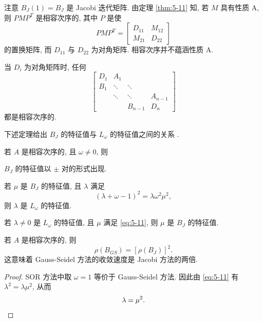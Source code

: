 注意 $B_J(1)=B_J$ 是 Jacobi 迭代矩阵. 由定理 \ref{thm:5-11} 知, 若 $M$ 具有性质 A, 则 $PMP^T$ 是相容次序的, 其中 $P$ 是使
\[
  PMP^T=
  \begin{bmatrix}
    D_{11} & M_{12}\\
    M_{21} & D_{22}
  \end{bmatrix}
\]
的置换矩阵, 而 $D_{11}$ 与 $D_{22}$ 为对角矩阵. 相容次序并不蕴涵性质 A.

\begin{example}
\label{ex:5-1}
当 $D_i$ 为对角矩阵时, 任何
\[
  \begin{bmatrix}
    D_1 & A_1 & & \\
    B_1 & \ddots & \ddots & \\
      & \ddots & \ddots & A_{n-1}\\
      & & B_{n-1} & D_n
  \end{bmatrix}
\]
都是相容次序的.
\end{example}

下述定理给出 $B_J$ 的特征值与 $L_\omega$ 的特征值之间的关系 \cite{src:30,src:85}.

\begin{theorem}
\label{thm:5-12}
若 $A$ 是相容次序的, 且 $\omega\neq0$, 则
\begin{romanlist}
  \item $B_J$ 的特征值以 $\pm$ 对的形式出现.
  \item 若 $\mu$ 是 $B_J$ 的特征值, 且 $\lambda$ 满足
  \begin{equation}
    (\lambda+\omega-1)^2=\lambda\omega^2\mu^2,
    \label{eq:5-11}
  \end{equation}
  则 $\lambda$ 是 $L_\omega$ 的特征值.
  \item 若 $\lambda\neq0$ 是 $L_\omega$ 的特征值, 且 $\mu$ 满足 \eqref{eq:5-11}, 则 $\mu$ 是 $B_J$ 的特征值.
\end{romanlist}
\end{theorem}

\begin{corollary}
\label{cor:5-1}
若 $A$ 是相容次序的, 则
\[
  \rho(B_{GS})=[\rho(B_J)]^2.
\]
这意味着 Gauss-Seidel 方法的收敛速度是 Jacobi 方法的两倍.
\end{corollary}

\begin{proof}
SOR 方法中取 $\omega=1$ 等价于 Gauss-Seidel 方法. 因此由 \eqref{eq:5-11} 有 $\lambda^2=\lambda\mu^2$, 从而
\[
  \lambda=\mu^2.\qedhere
\]
\end{proof}

